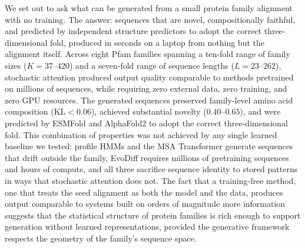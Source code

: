 
We set out to ask what can be generated from a small protein family alignment with no training. The answer: sequences that are novel, compositionally faithful, and predicted by independent structure predictors to adopt the correct three-dimensional fold, produced in seconds on a laptop from nothing but the alignment itself. Across eight Pfam families spanning a ten-fold range of family sizes ($K{=}37$--$420$) and a seven-fold range of sequence lengths ($L{=}23$--$262$), stochastic attention produced output quality comparable to methods pretrained on millions of sequences, while requiring zero external data, zero training, and zero GPU resources. The generated sequences preserved family-level amino acid composition (KL${}<0.06$), achieved substantial novelty ($0.40$--$0.65$), and were predicted by ESMFold and AlphaFold2 to adopt the correct three-dimensional fold. This combination of properties was not achieved by any single learned baseline we tested: profile HMMs and the MSA Transformer generate sequences that drift outside the family, EvoDiff requires millions of pretraining sequences and hours of compute, and all three sacrifice sequence identity to stored patterns in ways that stochastic attention does not. The fact that a training-free method, one that treats the seed alignment as both the model and the data, produces output comparable to systems built on orders of magnitude more information suggests that the statistical structure of protein families is rich enough to support generation without learned representations, provided the generative framework respects the geometry of the family's sequence space.

